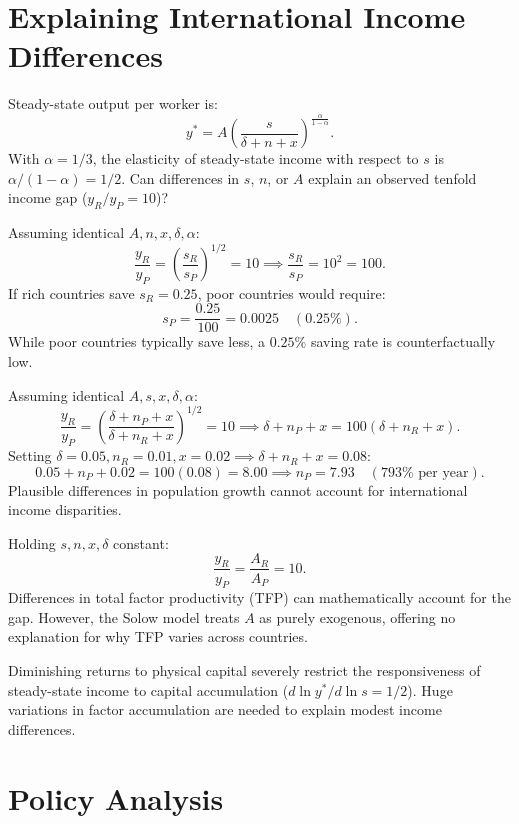 \documentclass[11pt]{article}
\begin{document}
\section{Explaining International Income Differences}

Steady-state output per worker is:
\[
y^* = A \left(\frac{s}{\delta+n+x}\right)^{\frac{\alpha}{1-\alpha}}.
\]
With $\alpha = 1/3$, the elasticity of steady-state income with respect to $s$ is $\alpha / (1-\alpha) = 1/2$. Can differences in $s$, $n$, or $A$ explain an observed tenfold income gap ($y_R / y_P = 10$)?

 Assuming identical $A, n, x, \delta, \alpha$:
\[
\frac{y_R}{y_P} = \left(\frac{s_R}{s_P}\right)^{1/2} = 10 \implies \frac{s_R}{s_P} = 10^2 = 100.
\]
If rich countries save $s_R = 0.25$, poor countries would require:
\[
s_P = \frac{0.25}{100} = 0.0025 \quad (0.25\%).
\]
While poor countries typically save less, a $0.25\%$ saving rate is counterfactually low.

 Assuming identical $A, s, x, \delta, \alpha$:
\[
\frac{y_R}{y_P} = \left(\frac{\delta + n_P + x}{\delta + n_R + x}\right)^{1/2} = 10 \implies \delta + n_P + x = 100(\delta + n_R + x).
\]
Setting $\delta = 0.05, n_R = 0.01, x = 0.02 \implies \delta + n_R + x = 0.08$:
\[
0.05 + n_P + 0.02 = 100(0.08) = 8.00 \implies n_P = 7.93 \quad (793\% \text{ per year}).
\]
Plausible differences in population growth cannot account for international income disparities.

 Holding $s, n, x, \delta$ constant:
\[
\frac{y_R}{y_P} = \frac{A_R}{A_P} = 10.
\]
Differences in total factor productivity (TFP) can mathematically account for the gap. However, the Solow model treats $A$ as purely exogenous, offering no explanation for why TFP varies across countries.

 Diminishing returns to physical capital severely restrict the responsiveness of steady-state income to capital accumulation ($d\ln y^* / d\ln s = 1/2$). Huge variations in factor accumulation are needed to explain modest income differences.

\section{Policy Analysis}
\end{document}
